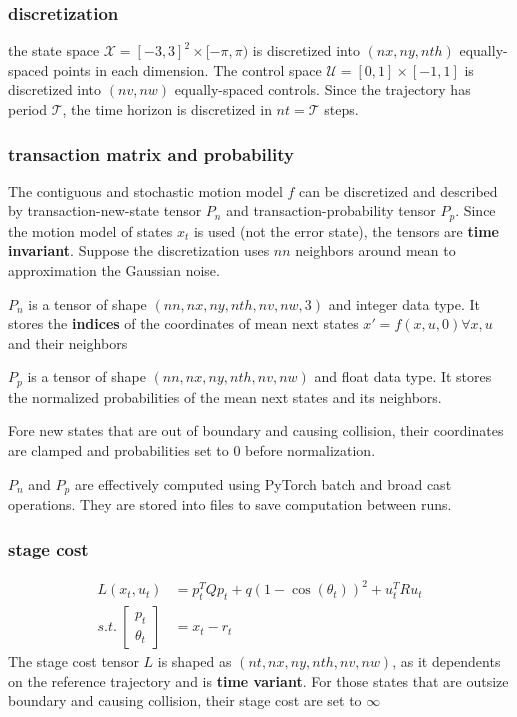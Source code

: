 \documentclass[conference]{IEEEtran}
\begin{document}
\subsubsection{discretization}
the state space $\mathcal{X} = [-3,3]^2\times[-\pi,\pi)$ is
discretized into $(nx, ny, nth)$ equally-spaced points in each dimension.
The control space $\mathcal{U} = [0,1]\times[-1,1]$ is discretized into $(nv,nw)$
equally-spaced controls.
Since the trajectory has period $\mathcal{T}$, 
the time horizon is discretized in $nt=\mathcal{T}$ steps.

\subsubsection{transaction matrix and probability}
The contiguous and stochastic motion model $f$ can be discretized and described by 
transaction-new-state tensor $P_n$ and transaction-probability tensor $P_p$.
Since the motion model of states $x_t$ is used (not the error state), 
the tensors are \textbf{time invariant}.
Suppose the discretization uses $nn$ neighbors around mean to approximation the Gaussian noise.


$P_n$ is a tensor of shape $(nn, nx, ny, nth, nv, nw, 3)$ and integer data type.
It stores the \textbf{indices} of the coordinates of mean next states $x' = f(x,u, 0) \forall x,u$ and their neighbors

$P_p$ is a tensor of shape $(nn, nx, ny, nth, nv, nw)$ and float data type.
It stores the normalized probabilities of the mean next states and its neighbors.

Fore new states that are out of boundary and causing collision, 
their coordinates are clamped and probabilities set to 0 before normalization.

$P_n$ and $P_p$ are effectively computed using PyTorch batch and broad cast operations.
They are stored into files to save computation between runs.

\subsubsection{stage cost}
$$
\begin{aligned}
L(x_t, u_t) &= 
    p^{T}_{t}Qp_{t} 
    + q\left( 1-\cos \left( \theta_{t}  \right)  \right)^{2} 
    + u^{T}_{t}Ru_{t} \\
s.t. \ \left[ \begin{gathered}p_{t}\\ \theta_{t} \end{gathered}  \right] 
    &= x_{t}-r_{t}
\end{aligned}
$$
The stage cost tensor $L$ is shaped as $(nt, nx, ny, nth, nv, nw)$,
as it dependents on the reference trajectory and is \textbf{time variant}.
For those states that are outsize boundary and causing collision, 
their stage cost are set to  $\infty$
\end{document}
